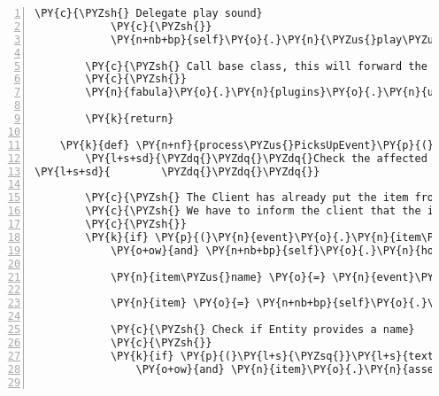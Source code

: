 \begin{Verbatim}[commandchars=\\\{\},numbers=left,firstnumber=1,stepnumber=1]
            \PY{c}{\PYZsh{} Delegate play sound}
            \PY{c}{\PYZsh{}}
            \PY{n+nb+bp}{self}\PY{o}{.}\PY{n}{\PYZus{}play\PYZus{}sound\PYZus{}surrounding\PYZus{}entity}\PY{p}{(}\PY{n}{entity}\PY{p}{)}

        \PY{c}{\PYZsh{} Call base class, this will forward the Event to the affected Entity.}
        \PY{c}{\PYZsh{}}
        \PY{n}{fabula}\PY{o}{.}\PY{n}{plugins}\PY{o}{.}\PY{n}{ui}\PY{o}{.}\PY{n}{UserInterface}\PY{o}{.}\PY{n}{process\PYZus{}MovesToEvent}\PY{p}{(}\PY{n+nb+bp}{self}\PY{p}{,} \PY{n}{event}\PY{p}{)}

        \PY{k}{return}

    \PY{k}{def} \PY{n+nf}{process\PYZus{}PicksUpEvent}\PY{p}{(}\PY{n+nb+bp}{self}\PY{p}{,} \PY{n}{event}\PY{p}{)}\PY{p}{:}
        \PY{l+s+sd}{\PYZdq{}\PYZdq{}\PYZdq{}Check the affected Entity, and give feedback that item is now in the inventory.}
\PY{l+s+sd}{        \PYZdq{}\PYZdq{}\PYZdq{}}

        \PY{c}{\PYZsh{} The Client has already put the item from Client.room to Client.rack.}
        \PY{c}{\PYZsh{} We have to inform the client that the item is now in the inventory}
        \PY{c}{\PYZsh{}}
        \PY{k}{if} \PY{p}{(}\PY{n}{event}\PY{o}{.}\PY{n}{item\PYZus{}identifier} \PY{o+ow}{in} \PY{n+nb+bp}{self}\PY{o}{.}\PY{n}{host}\PY{o}{.}\PY{n}{rack}\PY{o}{.}\PY{n}{owner\PYZus{}dict}\PY{o}{.}\PY{n}{keys}\PY{p}{(}\PY{p}{)}
            \PY{o+ow}{and} \PY{n+nb+bp}{self}\PY{o}{.}\PY{n}{host}\PY{o}{.}\PY{n}{rack}\PY{o}{.}\PY{n}{owner\PYZus{}dict}\PY{p}{[}\PY{n}{event}\PY{o}{.}\PY{n}{item\PYZus{}identifier}\PY{p}{]} \PY{o}{==} \PY{n+nb+bp}{self}\PY{o}{.}\PY{n}{host}\PY{o}{.}\PY{n}{client\PYZus{}id}\PY{p}{)}\PY{p}{:}

            \PY{n}{item\PYZus{}name} \PY{o}{=} \PY{n}{event}\PY{o}{.}\PY{n}{item\PYZus{}identifier}

            \PY{n}{item} \PY{o}{=} \PY{n+nb+bp}{self}\PY{o}{.}\PY{n}{host}\PY{o}{.}\PY{n}{rack}\PY{o}{.}\PY{n}{entity\PYZus{}dict}\PY{p}{[}\PY{n}{event}\PY{o}{.}\PY{n}{item\PYZus{}identifier}\PY{p}{]}

            \PY{c}{\PYZsh{} Check if Entity provides a name}
            \PY{c}{\PYZsh{}}
            \PY{k}{if} \PY{p}{(}\PY{l+s}{\PYZsq{}}\PY{l+s}{text/plain}\PY{l+s}{\PYZsq{}} \PY{o+ow}{in} \PY{n}{item}\PY{o}{.}\PY{n}{assets}\PY{o}{.}\PY{n}{keys}\PY{p}{(}\PY{p}{)}
                \PY{o+ow}{and} \PY{n}{item}\PY{o}{.}\PY{n}{assets}\PY{p}{[}\PY{l+s}{\PYZsq{}}\PY{l+s}{text/plain}\PY{l+s}{\PYZsq{}}\PY{p}{]}\PY{o}{.}\PY{n}{data} \PY{o+ow}{is} \PY{o+ow}{not} \PY{n+nb+bp}{None}\PY{p}{)}\PY{p}{:}


\end{Verbatim}
